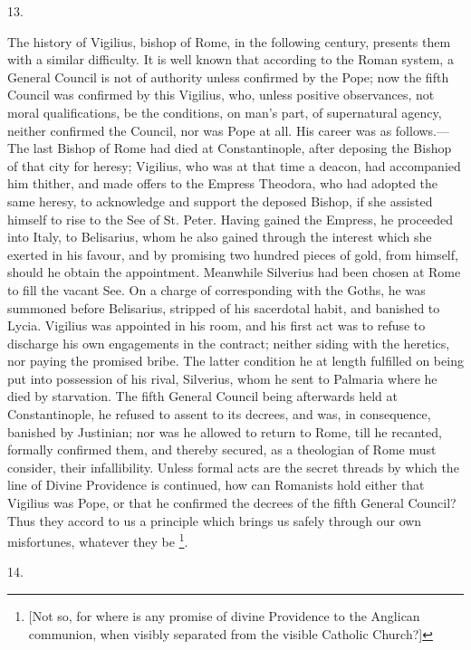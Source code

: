 13.

The history of Vigilius, bishop of Rome, in the following century,
presents them with a similar difficulty. It is well known that
according to the Roman system, a General Council is not of authority
unless confirmed by the Pope; now the fifth Council was confirmed by
this Vigilius, who, unless positive observances, not moral
qualifications, be the conditions, on man's part, of supernatural
agency, neither confirmed the Council, nor was Pope at all. His career
was as follows.—The last Bishop of Rome had died at Constantinople,
after deposing the Bishop of that city for heresy; Vigilius, who was
at that time a deacon, had accompanied him thither, and made offers to
the Empress Theodora, who had adopted the same heresy, to acknowledge
and support the deposed Bishop, if she assisted himself to rise to the
See of St. Peter. Having gained the Empress, he proceeded into Italy,
to Belisarius, whom he also gained through the interest which she
exerted in his favour, and by promising two hundred pieces of gold,
from himself, should he obtain the appointment. Meanwhile Silverius
had been chosen at Rome to fill the vacant See. On a charge of
corresponding with the Goths, he was summoned before Belisarius,
stripped of his sacerdotal habit, and banished to Lycia. Vigilius was
appointed in his room, and his first act was to refuse to discharge
his own engagements in the contract; neither siding with the
heretics, nor paying the promised bribe. The latter condition he at
length fulfilled on being put into possession of his rival, Silverius,
whom he sent to Palmaria where he died by starvation. The fifth
General Council being afterwards held at Constantinople, he refused to
assent to its decrees, and was, in consequence, banished by Justinian;
nor was he allowed to return to Rome, till he recanted, formally
confirmed them, and thereby secured, as a theologian of Rome must
consider, their infallibility. Unless formal acts are the secret
threads by which the line of Divine Providence is continued, how can
Romanists hold either that Vigilius was Pope, or that he confirmed the
decrees of the fifth General Council? Thus they accord to us a
principle which brings us safely through our own misfortunes, whatever
they be \footnote{[Not so, for where is any promise of
divine Providence to the Anglican communion, when visibly separated
from the visible Catholic Church?]}.

14.


